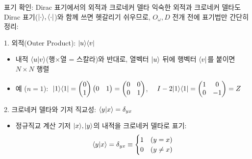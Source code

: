 \documentclass[aspectratio=169, 10pt]{beamer}
\begin{document}
\begin{frame}{표기 확인: Dirac 표기에서의 외적과 크로네커 델타}
    익숙한 외적과 크로네커 델타도 Dirac 표기($|\cdot\rangle, \langle\cdot|$)와 함께 쓰면 헷갈리기 쉬우므로, $O_\omega, D$ 전개 전에 표기법만 간단히 정리:
    \pause
    \vspace{0.08cm}
    \begin{qcblock}{1. 외적(Outer Product): $|u\rangle\langle v|$}
        \begin{itemize}
            \item 내적 $\langle u|v\rangle$(행$\times$열 = 스칼라)와 반대로, 열벡터 $|u\rangle$ 뒤에 행벡터 $\langle v|$를 붙이면 $N \times N$ 행렬
            \pause
            \item 예 ($n=1$): $\;|1\rangle\langle1| = \begin{pmatrix} 0 \\ 1 \end{pmatrix}\begin{pmatrix} 0 & 1 \end{pmatrix} = \begin{pmatrix} 0 & 0 \\ 0 & 1 \end{pmatrix}$, $\quad I - 2|1\rangle\langle1| = \begin{pmatrix} 1 & 0 \\ 0 & -1 \end{pmatrix} = Z$
        \end{itemize}
    \end{qcblock}
    \pause
    \vspace{0.08cm}
    \begin{qctip}{2. 크로네커 델타와 기저 직교성: $\langle y|x\rangle = \delta_{yx}$}
        \begin{itemize}
            \item 정규직교 계산 기저 $|x\rangle, |y\rangle$의 내적을 크로네커 델타로 표기:
            $$\langle y|x\rangle = \delta_{yx} \equiv \begin{cases} 1 & (y=x) \\ 0 & (y\neq x) \end{cases}$$
        \end{itemize}
    \end{qctip}
\end{frame}
\end{document}
